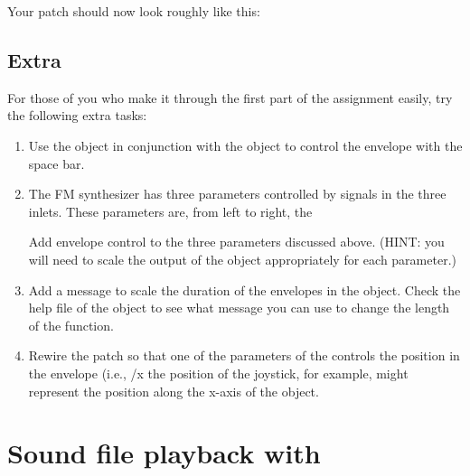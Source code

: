 Your patch should now look roughly like this:

\subsection{Extra}

For those of you who make it through the first part of the assignment easily, try the following extra
tasks:

\begin{enumerate}
\item Use the  object in conjunction with the  object to control the envelope
with the space bar.
\item The FM synthesizer has three parameters controlled by signals in the three inlets.  These
parameters are, from left to right, the

Add envelope control to the three parameters discussed above.  (HINT:  you will need to scale the output
of the  object appropriately for each parameter.)

\item Add a message to scale the duration of the envelopes in the  object.  Check the help
file of the  object to see what message you can use to change the length of the function.

\item Rewire the patch so that one of the parameters of the \gt{} controls the position in the envelope
(i.e., /x the position of the joystick, for example, might represent the position along the x-axis
of the  object.


\end{enumerate}













\section{Sound file playback with }\label{sec:buffer}

